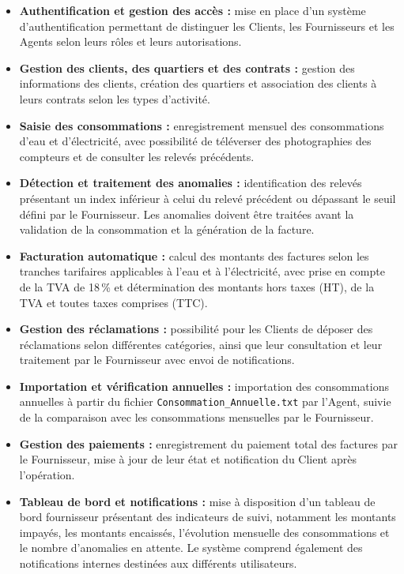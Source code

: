 \begin{itemize}
    \item \textbf{Authentification et gestion des accès :} mise en place d'un système d'authentification permettant de distinguer les Clients, les Fournisseurs et les Agents selon leurs rôles et leurs autorisations.

    \item \textbf{Gestion des clients, des quartiers et des contrats :} gestion des informations des clients, création des quartiers et association des clients à leurs contrats selon les types d'activité.

    \item \textbf{Saisie des consommations :} enregistrement mensuel des consommations d'eau et d'électricité, avec possibilité de téléverser des photographies des compteurs et de consulter les relevés précédents.

    \item \textbf{Détection et traitement des anomalies :} identification des relevés présentant un index inférieur à celui du relevé précédent ou dépassant le seuil défini par le Fournisseur. Les anomalies doivent être traitées avant la validation de la consommation et la génération de la facture.

    \item \textbf{Facturation automatique :} calcul des montants des factures selon les tranches tarifaires applicables à l'eau et à l'électricité, avec prise en compte de la TVA de 18\,\% et détermination des montants hors taxes (HT), de la TVA et toutes taxes comprises (TTC).

    \item \textbf{Gestion des réclamations :} possibilité pour les Clients de déposer des réclamations selon différentes catégories, ainsi que leur consultation et leur traitement par le Fournisseur avec envoi de notifications.

    \item \textbf{Importation et vérification annuelles :} importation des consommations annuelles à partir du fichier \texttt{Consommation\_Annuelle.txt} par l'Agent, suivie de la comparaison avec les consommations mensuelles par le Fournisseur.

    \item \textbf{Gestion des paiements :} enregistrement du paiement total des factures par le Fournisseur, mise à jour de leur état et notification du Client après l'opération.

    \item \textbf{Tableau de bord et notifications :} mise à disposition d'un tableau de bord fournisseur présentant des indicateurs de suivi, notamment les montants impayés, les montants encaissés, l'évolution mensuelle des consommations et le nombre d'anomalies en attente. Le système comprend également des notifications internes destinées aux différents utilisateurs.
\end{itemize}

